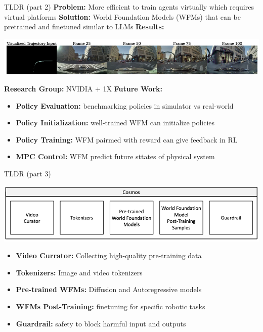 \documentclass{beamer}
\begin{document}
\begin{frame}[t]{TLDR (part 2)}
    \textbf{Problem:} More efficient to train agents virtually which requires virtual platforms \newline
    \textbf{Solution:} World Foundation Models (WFMs) that can be pretrained and finetuned similar to LLMs\newline
    \textbf{Results:} 
    \begin{center}
        \includegraphics[width=\textwidth]{./img/tldr_1.png}
    \end{center} 
    \textbf{Research Group:} NVIDIA + 1X\newline
    \textbf{Future Work:}
    \small
    \begin{itemize}[label=-]
        \item \textbf{Policy Evaluation:} benchmarking policies in simulator vs real-world
        \item \textbf{Policy Initialization:} well-trained WFM can initialize policies 
        \item \textbf{Policy Training:} WFM pairmed with reward can give feedback in RL
        \item \textbf{MPC Control:} WFM predict future sttates of physical system
    \end{itemize}
    \normalsize
\end{frame}


\begin{frame}[t]{TLDR (part 3)}
    \begin{center}
        \includegraphics[width=\textwidth]{./img/tldr_3.png}
    \end{center} 
    \small
    \begin{itemize}[label=-]
        \item \textbf{Video Currator:} Collecting high-quality pre-training data
        \item \textbf{Tokenizers:} Image and video tokenizers
        \item \textbf{Pre-trained WFMs:} Diffusion and Autoregressive models
        \item \textbf{WFMs Post-Training:} finetuning for specific robotic tasks
        \item \textbf{Guardrail:} safety to block harmful input and outputs
    \end{itemize}
    \normalsize
\end{frame}
\end{document}
